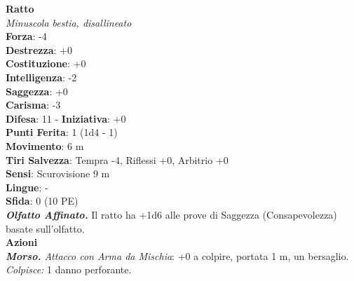\begin{multicols}{2}
\medskip\textbf{Ratto}\\
\emph{Minuscola bestia, disallineato}\\
\textbf{Forza}: -4\\
\textbf{Destrezza}: +0\\
\textbf{Costituzione}: +0\\
\textbf{Intelligenza}: -2\\
\textbf{Saggezza}: +0\\
\textbf{Carisma}: -3\\
\textbf{Difesa}: 11 - \textbf{Iniziativa}: +0\\
\textbf{Punti Ferita}: 1 (1d4 - 1)\\
\textbf{Movimento}: 6 m\\
\textbf{Tiri Salvezza}: Tempra -4, Riflessi +0, Arbitrio +0 \\
\textbf{Sensi}: Scurovisione 9 m\\
\textbf{Lingue}: -\\
\textbf{Sfida}: 0 (10 PE)\smallskip\\
\emph{\textbf{Olfatto Affinato.}} Il ratto ha +1d6 alle prove di Saggezza (Consapevolezza) basate sull'olfatto.\\
\smallskip\textbf{Azioni}\\
\emph{\textbf{Morso.} Attacco con Arma da Mischia}: +0 a colpire, portata 1 m, un bersaglio.\\
\emph{Colpisce:} 1 danno perforante.\\


\end{multicols}
